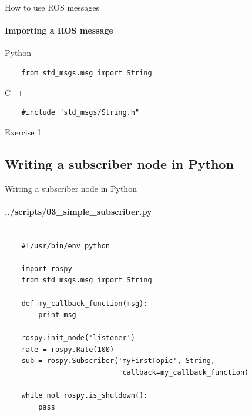 \documentclass{beamer}
\begin{document}
\begin{frame}[fragile]{How to use ROS messages}
    \framesubtitle{Importing a ROS message}
{    
   
\begin{terminal2}
    {Python}
    \begin{lstlisting}
    from std_msgs.msg import String
    \end{lstlisting} 
\end{terminal2}
}

{	
\begin{terminal2}
    {C++}
    \begin{lstlisting}
    #include "std_msgs/String.h"
    \end{lstlisting} 
\end{terminal2}
}
\end{frame}


\begin{frame}[plain]{}  
    \centering
    {\huge \textcolor{black}{Exercise 1}}
\end{frame}





\subsection{Writing a subscriber node in Python}

\begin{frame}[fragile]{Writing a subscriber node in Python}
    \framesubtitle{../scripts/03\_simple\_subscriber.py}
    \begin{lstlisting}
    
    #!/usr/bin/env python
    
    import rospy
    from std_msgs.msg import String

    def my_callback_function(msg):
        print msg
    
    rospy.init_node('listener')
    rate = rospy.Rate(100) 
    sub = rospy.Subscriber('myFirstTopic', String,
                            callback=my_callback_function)
    
    while not rospy.is_shutdown():
        pass
    
    
    \end{lstlisting}
\end{frame}
\end{document}
